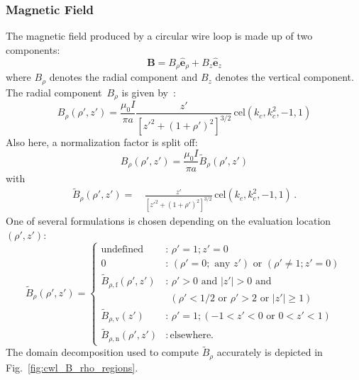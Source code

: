 \subsubsection{Magnetic Field}
The magnetic field produced by a circular wire loop is made up of two components:
\begin{equation}
  \mathbf{B} = B_\rho \hat{\mathbf{e}}_\rho + B_z \hat{\mathbf{e}}_z
\end{equation}
where $B_\rho$ denotes the radial component and $B_z$ denotes the vertical component.
The radial component~$B_\rho$ is given by~\cite{teal}:
\begin{equation}
  B_\rho(\rho', z')
  = \frac{\mu_0 I}{\pi a} \frac{z'}{\left[ z'^2 + (1 + \rho')^2 \right]^{3/2}} \,\mathrm{cel}(k_c, k_c^2, -1, 1)
\end{equation}
Also here, a normalization factor is split off:
\begin{equation}
  B_\rho(\rho', z') = \frac{\mu_0 I}{\pi a} \tilde{B}_\rho(\rho', z')
\end{equation}
with
\begin{align}
  \tilde{B}_\rho(\rho', z')
  =&\, \frac{z'}{\left[ z'^2 + (1 + \rho')^2 \right]^{3/2}} \,\mathrm{cel}(k_c, k_c^2, -1, 1) \, .
\end{align}
One of several formulations is chosen depending on the evaluation location~$(\rho', z')$:
\begin{equation}
  \tilde{B}_\rho(\rho', z')
  = \begin{cases}
      \textrm{undefined}                      &:\, \rho' = 1; z' = 0 \\
      0                                       &:\, (\rho' = 0; \textrm{ any } z') \textrm{ or } (\rho' \neq 1; z' = 0) \\
      \tilde{B}_{\rho,\mathrm{f}} (\rho', z') &:\, \rho' > 0 \textrm{ and } |z'| > 0 \textrm{ and } \\
                     ~                        &~~ (\rho' < 1/2 \textrm{ or } \rho' > 2 \textrm{ or } |z'| \geq 1 ) \\
      \tilde{B}_{\rho,\mathrm{v}} (z')        &:\, \rho' = 1; ( -1 < z' < 0 \textrm{ or } 0 < z' < 1) \\
      \tilde{B}_{\rho,\mathrm{n}} (\rho', z') &:\, \textrm{elsewhere.}
    \end{cases} \label{eqn:cwl_B_rho_switchover}
\end{equation}
The domain decomposition used to compute $\tilde{B}_\rho$ accurately is depicted in Fig.~\ref{fig:cwl_B_rho_regions}.
